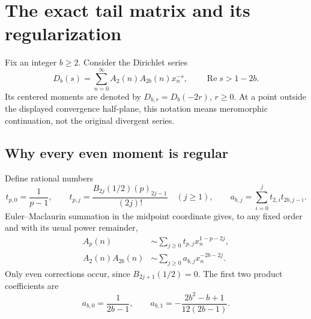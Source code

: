 \documentclass[11pt,letterpaper]{article}
\theoremstyle{definition}
\theoremstyle{remark}
\DeclareMathOperator{\Rea}{Re}
\numberwithin{equation}{section}
\begin{document}
\section{The exact tail matrix and its regularization}
\label{sec:tail-foundation}

Fix an integer $b\geq2$. Consider the Dirichlet series
\begin{equation}\label{eq:Db}
 D_b(s)=\sum_{n=0}^{\infty}A_2(n)A_{2b}(n)x_n^{-s},
 \qquad \Rea s>1-2b.
\end{equation}
Its centered moments are denoted by $D_{b,r}=D_b(-2r)$, $r\geq0$.
At a point outside the displayed convergence half-plane, this notation
means meromorphic continuation, not the original divergent series.

\subsection{Why every even moment is regular}

Define rational numbers
\begin{equation}\label{eq:tail-coefficients}
 t_{p,0}=\frac1{p-1},\qquad
 t_{p,j}=\frac{B_{2j}(1/2)(p)_{2j-1}}{(2j)!}\quad(j\geq1),
 \qquad
 a_{b,j}=\sum_{i=0}^j t_{2,i}t_{2b,j-i}.
\end{equation}
Euler--Maclaurin summation in the midpoint coordinate gives, to any fixed
order and with its usual power remainder,
\begin{align}
 A_p(n)&\sim\sum_{j\geq0}t_{p,j}x_n^{1-p-2j},
 \label{eq:tail-expansion}\\
 A_2(n)A_{2b}(n)&\sim\sum_{j\geq0}a_{b,j}x_n^{-2b-2j}.
 \label{eq:tail-product-expansion}
\end{align}
Only even corrections occur, since $B_{2j+1}(1/2)=0$.
The first two product coefficients are
\begin{equation}\label{eq:first-tail-coeff}
 a_{b,0}=\frac1{2b-1},\qquad
 a_{b,1}=-\frac{2b^2-b+1}{12(2b-1)}.
\end{equation}
\end{document}
